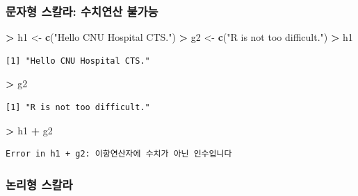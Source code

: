 \documentclass[11pt,a4paper]{book}
\newenvironment{Shaded}{\begin{snugshade}}{\end{snugshade}}
\newcommand{\KeywordTok}[1]{\textcolor[rgb]{0.13,0.29,0.53}{\textbf{#1}}}
\newcommand{\StringTok}[1]{\textcolor[rgb]{0.31,0.60,0.02}{#1}}
\newcommand{\OperatorTok}[1]{\textcolor[rgb]{0.81,0.36,0.00}{\textbf{#1}}}
\newcommand{\NormalTok}[1]{#1}
\theoremstyle{definition}
\theoremstyle{definition}
\theoremstyle{definition}
\theoremstyle{remark}
\begin{document}
\normalsize

\subsubsection{문자형 스칼라: 수치연산 불가능}\label{---}

\footnotesize

\begin{Shaded}
\begin{Highlighting}[]
\OperatorTok{>}\StringTok{ }\NormalTok{h1 <-}\StringTok{ }\KeywordTok{c}\NormalTok{(}\StringTok{"Hello CNU Hospital CTS."}\NormalTok{)}
\OperatorTok{>}\StringTok{ }\NormalTok{g2 <-}\StringTok{ }\KeywordTok{c}\NormalTok{(}\StringTok{"R is not too difficult."}\NormalTok{)}
\OperatorTok{>}\StringTok{ }\NormalTok{h1}
\end{Highlighting}
\end{Shaded}

\begin{verbatim}
[1] "Hello CNU Hospital CTS."
\end{verbatim}

\begin{Shaded}
\begin{Highlighting}[]
\OperatorTok{>}\StringTok{ }\NormalTok{g2}
\end{Highlighting}
\end{Shaded}

\begin{verbatim}
[1] "R is not too difficult."
\end{verbatim}

\begin{Shaded}
\begin{Highlighting}[]
\OperatorTok{>}\StringTok{ }\NormalTok{h1 }\OperatorTok{+}\StringTok{ }\NormalTok{g2}
\end{Highlighting}
\end{Shaded}

\begin{verbatim}
Error in h1 + g2: 이항연산자에 수치가 아닌 인수입니다
\end{verbatim}

\normalsize

\subsubsection{논리형 스칼라}\label{-}
\end{document}
